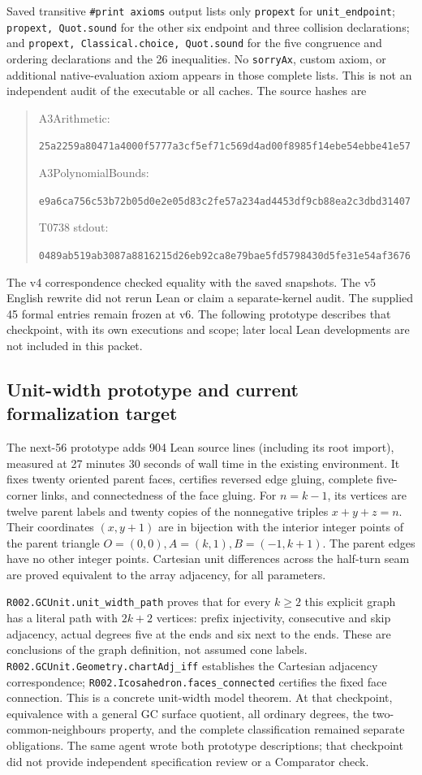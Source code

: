\documentclass[11pt]{amsart}
\newcommand{\record}[1]{\nolinkurl{#1}}
\begin{document}
Saved transitive \texttt{\#print axioms} output lists only
\record{propext} for \record{unit_endpoint}; \texttt{propext, Quot.sound}
for the other six endpoint and three collision declarations; and
\texttt{propext, Classical.choice, Quot.sound} for the five congruence
and ordering declarations and the 26 inequalities. No \record{sorryAx},
custom axiom, or additional native-evaluation axiom appears in those
complete lists. This is not an independent audit of the executable
or all caches. The source hashes are
\begin{quote}\small
A3Arithmetic:\par
\record{25a2259a80471a4000f5777a3cf5ef71c569d4ad00f8985f14ebe54ebbe41e57}\par
A3PolynomialBounds:\par
\record{e9a6ca756c53b72b05d0e2e05d83c2fe57a234ad4453df9cb88ea2c3dbd31407}\par
T0738 stdout:\par
\record{0489ab519ab3087a8816215d26eb92ca8e79bae5fd5798430d5fe31e54af3676}
\end{quote}
The v4 correspondence checked equality with the saved snapshots.
The v5 English rewrite did not rerun Lean or claim a separate-kernel audit.
The supplied 45 formal entries remain frozen at v6. The following
prototype describes that checkpoint, with its own executions and scope;
later local Lean developments are not included in this packet.

\subsection{Unit-width prototype and current formalization target}
The next-56 prototype adds 904 Lean source lines (including its root
import), measured at 27 minutes 30 seconds of wall time in the existing
environment. It fixes twenty oriented parent faces, certifies reversed
edge gluing, complete five-corner links, and connectedness of the face
gluing. For $n=k-1$, its vertices are twelve parent labels and twenty
copies of the nonnegative triples $x+y+z=n$. Their coordinates $(x,y+1)$
are in bijection with the interior integer points of the parent triangle
$O=(0,0), A=(k,1), B=(-1,k+1)$. The parent edges have no other integer
points. Cartesian unit differences across the half-turn seam are proved
equivalent to the array adjacency, for all parameters.

\record{R002.GCUnit.unit_width_path} proves that for every $k\ge2$ this
explicit graph has a literal path with $2k+2$ vertices: prefix
injectivity, consecutive and skip adjacency, actual degrees five at
the ends and six next to the ends. These are conclusions of the graph
definition, not assumed cone labels.
\record{R002.GCUnit.Geometry.chartAdj_iff} establishes the Cartesian
adjacency correspondence; \record{R002.Icosahedron.faces_connected}
certifies the fixed face connection. This is a concrete unit-width
model theorem. At that checkpoint, equivalence with a general GC surface
quotient, all ordinary degrees, the two-common-neighbours property,
and the complete classification remained separate obligations. The same
agent wrote both prototype descriptions; that checkpoint did not provide
independent specification review or a Comparator check.
\end{document}
